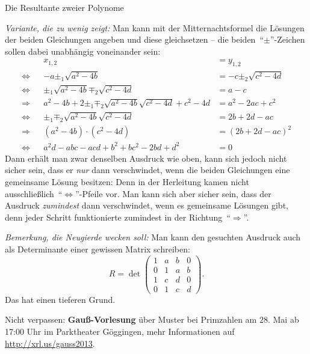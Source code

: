 \documentclass{algblatt}
\begin{document}
\begin{aufgabe}{Die Resultante zweier Polynome}
\begin{loesungE}
\emph{Variante, die zu wenig zeigt:} Man kann mit der Mitternachtsformel die
Lösungen der beiden Gleichungen angeben und diese gleichsetzen -- die
beiden~"`$\pm$"'-Zeichen sollen dabei unabhängig voneinander sein:
\begin{align*}
  && x_{1,2} &= y_{1,2} \\
  \Longleftrightarrow &&
    -a \pm_1 \sqrt{a^2 - 4b} &= -c \pm_2 \sqrt{c^2 - 4d} \\
  \Longleftrightarrow &&
    \pm_1\sqrt{a^2 - 4b} \mp_2\sqrt{c^2 - 4d} &= a - c \\
  \Longrightarrow &&
    a^2 - 4b + 2 \pm_1 \mp_2 \sqrt{a^2-4b}\sqrt{c^2-4d} + c^2 - 4d &= a^2 - 2ac + c^2 \\
  \Longleftrightarrow &&
    \pm_1 \mp_2 \sqrt{a^2-4b}\sqrt{c^2-4d} &= 2b + 2d - ac \\
  \Longrightarrow &&
    (a^2 - 4b) \cdot (c^2 - 4d) &= (2b + 2d - ac)^2 \\
  \Longleftrightarrow &&
    a^2d - abc - acd + b^2 + bc^2 - 2bd + d^2 &= 0
\end{align*}
Dann erhält man zwar denselben Ausdruck wie oben, kann sich jedoch nicht sicher
sein, dass er \emph{nur} dann verschwindet, wenn die beiden Gleichungen eine
gemeinsame Lösung besitzen: Denn in der Herleitung kamen nicht
ausschließlich~"`$\Leftrightarrow$"'-Pfeile vor. Man kann sich aber sicher
sein, dass der Ausdruck \emph{zumindest} dann verschwindet, wenn es gemeinsame
Lösungen gibt, denn jeder Schritt funktionierte zumindest in der
Richtung~"`$\Rightarrow$"'.

\emph{Bemerkung, die Neugierde wecken soll:} Man kann den gesuchten Ausdruck
auch als Determinante einer gewissen Matrix schreiben:
\[ R = \det\begin{pmatrix}
  1 & a & b & 0 \\
  0 & 1 & a & b \\
  1 & c & d & 0 \\
  0 & 1 & c & d
\end{pmatrix}\!. \]
Das hat einen tieferen Grund.
\end{loesungE}
\end{aufgabe}

Nicht verpassen: \textbf{Gauß-Vorlesung} über Muster bei Primzahlen am 28. Mai
ab 17:00 Uhr im Parktheater Göggingen, mehr Informationen auf
\url{http://xrl.us/gauss2013}.
 
\end{document}
